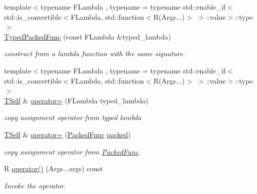 \begin{DoxyCompactItemize}
{\footnotesize template$<$typename F\+Lambda , typename  = typename std\+::enable\+\_\+if$<$             std\+::is\+\_\+convertible$<$\+F\+Lambda,                                 std\+::function$<$\+R(\+Args...)$>$                                 $>$\+::value$>$\+::type$>$ }\\\hyperlink{classtvm_1_1runtime_1_1TypedPackedFunc_3_01R_07Args_8_8_8_08_4_a36ca0d1876544463ee848766e70e5e96}{Typed\+Packed\+Func} (const F\+Lambda \&typed\+\_\+lambda)
\begin{DoxyCompactList}\small\item\em construct from a lambda function with the same signature. \end{DoxyCompactList}\item 
{\footnotesize template$<$typename F\+Lambda , typename  = typename std\+::enable\+\_\+if$<$             std\+::is\+\_\+convertible$<$\+F\+Lambda,                                 std\+::function$<$\+R(\+Args...)$>$                                 $>$\+::value$>$\+::type$>$ }\\\hyperlink{classtvm_1_1runtime_1_1TypedPackedFunc_3_01R_07Args_8_8_8_08_4_afaeae1b79f815895ab9ab09b444e7ba3}{T\+Self} \& \hyperlink{classtvm_1_1runtime_1_1TypedPackedFunc_3_01R_07Args_8_8_8_08_4_a8dd1fbae84cb9597c52977b0e8db64dc}{operator=} (F\+Lambda typed\+\_\+lambda)
\begin{DoxyCompactList}\small\item\em copy assignment operator from typed lambda \end{DoxyCompactList}\item 
\hyperlink{classtvm_1_1runtime_1_1TypedPackedFunc_3_01R_07Args_8_8_8_08_4_afaeae1b79f815895ab9ab09b444e7ba3}{T\+Self} \& \hyperlink{classtvm_1_1runtime_1_1TypedPackedFunc_3_01R_07Args_8_8_8_08_4_aa590b3e712e06867805b41aaf17019ed}{operator=} (\hyperlink{classtvm_1_1runtime_1_1PackedFunc}{Packed\+Func} \hyperlink{classtvm_1_1runtime_1_1TypedPackedFunc_3_01R_07Args_8_8_8_08_4_ac0ad0eb56ab0f12d91adb50dab38ddab}{packed})
\begin{DoxyCompactList}\small\item\em copy assignment operator from \hyperlink{classtvm_1_1runtime_1_1PackedFunc}{Packed\+Func}. \end{DoxyCompactList}\item 
R \hyperlink{classtvm_1_1runtime_1_1TypedPackedFunc_3_01R_07Args_8_8_8_08_4_ad76f4953dcc7a98bb8ad6b15994090d8}{operator()} (Args...\+args) const 
\begin{DoxyCompactList}\small\item\em Invoke the operator. \end{DoxyCompactList}\item 

\end{DoxyCompactItemize}
